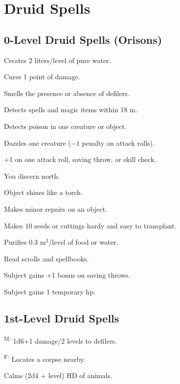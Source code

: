 \section{Druid Spells}



\subsection{0-Level Druid Spells (Orisons)}

 Creates 2 liters/level of pure water.

 Cures 1 point of damage.

 Smells the presence or absence of defilers.

 Detects spells and magic items within 18 m.

 Detects poison in one creature or object.

 Dazzles one creature ($-1$ penalty on attack rolls).

 +1 on one attack roll, saving throw, or skill check.

 You discern north.

 Object shines like a torch.

 Makes minor repairs on an object.

 Makes 10 seeds or cuttings hardy and easy to transplant.

 Purifies 0.3 m$^3$/level of food or water.

 Read scrolls and spellbooks.

 Subject gains +1 bonus on saving throws.

 Subject gains 1 temporary hp.



\subsection{1st-Level Druid Spells}

\textsuperscript{M:} 1d6+1 damage/2 levels to defilers.

\textsuperscript{F:} Locates a corpse nearby.

 Calms (2d4 + level) HD of animals.

